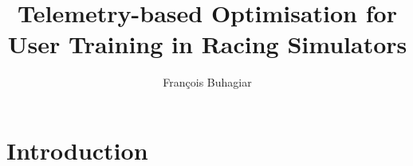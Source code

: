 \documentclass{sig-alternate}
\begin{document}
\title{Telemetry-based Optimisation for User Training in Racing Simulators}

\author{
	\alignauthor
	Fran\c{c}ois Buhagiar\\
}

\maketitle
\begin{abstract}

\end{abstract}


\section{Introduction}
\end{document}
